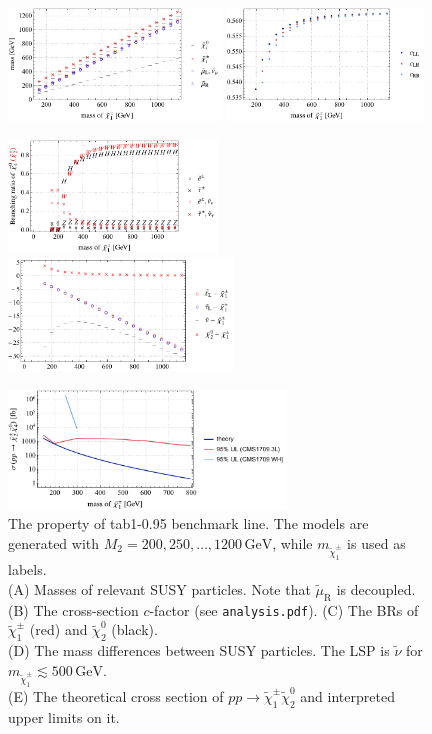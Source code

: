 \documentclass[a4paper,10pt,captions=tableheading,DIV=14]{scrartcl}
\numberwithin{equation}{section}
\newcommand\w[1]{_{\mathrm{#1}}}
\newcommand\unit[1]{\,\mathrm{#1}\xspace}
\newcommand\GeV{\unit{GeV}}
\newcommand\neut  [1][\relax]{{\tilde\chi^0_{#1}}}
\newcommand\charPM[1][\relax]{{\tilde\chi^\pm_{#1}}}
\begin{document}
\begin{figure}[h]
  \centering
  \includegraphics[height=85pt]{../plots/plot_tab1x095_mass.pdf}
  \includegraphics[height=85pt]{../plots/plot_tab1x095_cfactors.pdf}
\par
  \includegraphics[height=85pt]{../plots/plot_tab1x095_br21.pdf}
  \includegraphics[height=85pt]{../plots/plot_tab1x095_massdiff.pdf}
\par
  \includegraphics[height=90pt]{../plots/plot_tab1x095_limit21.pdf}
  \caption{\label{fig:tab1x095}The property of tab1-0.95 benchmark line. The models are generated with $M_2=200,250,\dots,1200\GeV$, while $m_{\charPM[1]}$ is used as labels.\\
 (A) Masses of relevant SUSY particles. Note that $\tilde\mu\w R$ is decoupled.
 (B) The cross-section $c$-factor (see \texttt{analysis.pdf}).
 (C) The BRs of $\charPM[1]$ (red) and $\neut[2]$ (black).\\
 (D) The mass differences between SUSY particles. The LSP is  $\tilde\nu$ for $m_{\charPM[1]}\lesssim 500\GeV$.\\
 (E) The theoretical cross section of $pp\to\charPM[1]\neut[2]$ and interpreted upper limits on it.
}
\end{figure}
\end{document}
